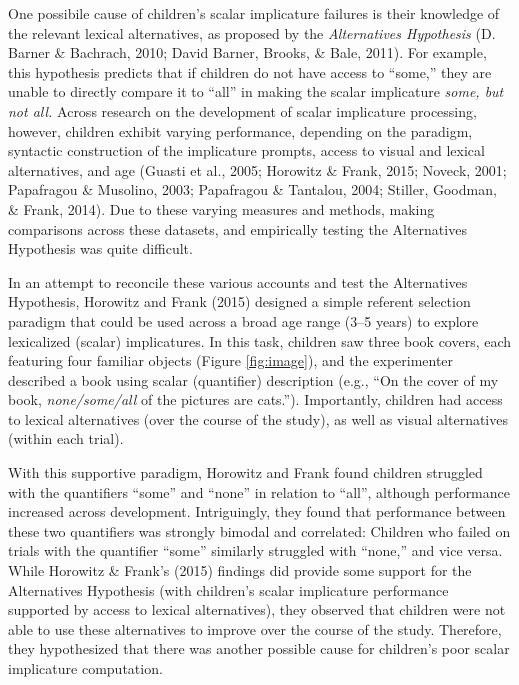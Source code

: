 \documentclass[10pt, letterpaper]{article}
\begin{document}
One possibile cause of children's scalar implicature failures is their
knowledge of the relevant lexical alternatives, as proposed by the
\emph{Alternatives Hypothesis} (D. Barner \& Bachrach, 2010; David
Barner, Brooks, \& Bale, 2011). For example, this hypothesis predicts
that if children do not have access to ``some,'' they are unable to
directly compare it to ``all'' in making the scalar implicature
\emph{some, but not all.} Across research on the development of scalar
implicature processing, however, children exhibit varying performance,
depending on the paradigm, syntactic construction of the implicature
prompts, access to visual and lexical alternatives, and age (Guasti et
al., 2005; Horowitz \& Frank, 2015; Noveck, 2001; Papafragou \&
Musolino, 2003; Papafragou \& Tantalou, 2004; Stiller, Goodman, \&
Frank, 2014). Due to these varying measures and methods, making
comparisons across these datasets, and empirically testing the
Alternatives Hypothesis was quite difficult.

In an attempt to reconcile these various accounts and test the
Alternatives Hypothesis, Horowitz and Frank (2015) designed a simple
referent selection paradigm that could be used across a broad age range
(3--5 years) to explore lexicalized (scalar) implicatures. In this task,
children saw three book covers, each featuring four familiar objects
(Figure \ref{fig:image}), and the experimenter described a book using
scalar (quantifier) description (e.g., ``On the cover of my book,
\emph{none/some/all} of the pictures are cats.''). Importantly, children
had access to lexical alternatives (over the course of the study), as
well as visual alternatives (within each trial).

With this supportive paradigm, Horowitz and Frank found children
struggled with the quantifiers ``some'' and ``none'' in relation to
``all'', although performance increased across development.
Intriguingly, they found that performance between these two quantifiers
was strongly bimodal and correlated: Children who failed on trials with
the quantifier ``some'' similarly struggled with ``none,'' and vice
versa. While Horowitz \& Frank's (2015) findings did provide some
support for the Alternatives Hypothesis (with children's scalar
implicature performance supported by access to lexical alternatives),
they observed that children were not able to use these alternatives to
improve over the course of the study. Therefore, they hypothesized that
there was another possible cause for children's poor scalar implicature
computation.
\end{document}
